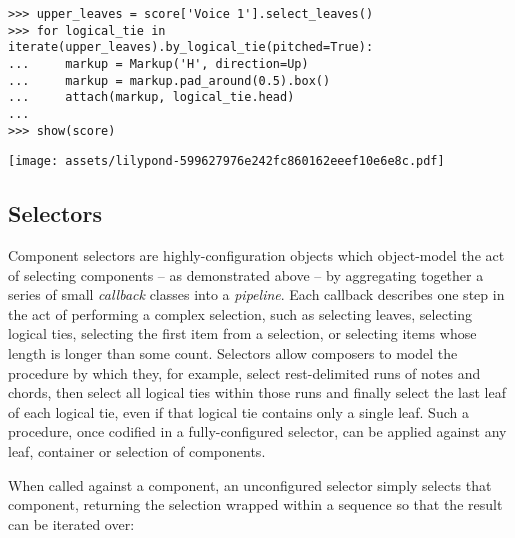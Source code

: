 \begin{comment}
<abjad>
upper_leaves = score['Voice 1'].select_leaves()
for logical_tie in iterate(upper_leaves).by_logical_tie(pitched=True):
    markup = Markup('H', direction=Up)
    markup = markup.pad_around(0.5).box()
    attach(markup, logical_tie.head)

show(score)
</abjad>
\end{comment}

\begin{abjadbookoutput}
\begin{singlespacing}
\vspace{-0.5\baselineskip}
\begin{lstlisting}
>>> upper_leaves = score['Voice 1'].select_leaves()
>>> for logical_tie in iterate(upper_leaves).by_logical_tie(pitched=True):
...     markup = Markup('H', direction=Up)
...     markup = markup.pad_around(0.5).box()
...     attach(markup, logical_tie.head)
...
>>> show(score)
\end{lstlisting}
\noindent\texttt{[image: assets/lilypond-599627976e242fc860162eeef10e6e8c.pdf]}
\end{singlespacing}
\end{abjadbookoutput}

\subsection{Selectors}
\label{ssec:selectors}

Component selectors are highly-configuration objects which object-model the act
of selecting components -- as demonstrated above -- by aggregating together a
series of small \emph{callback} classes into a \emph{pipeline}. Each callback
describes one step in the act of performing a complex selection, such as
selecting leaves, selecting logical ties, selecting the first item from a
selection, or selecting items whose length is longer than some count. Selectors
allow composers to model the procedure by which they, for example, select
rest-delimited runs of notes and chords, then select all logical ties within
those runs and finally select the last leaf of each logical tie, even if that
logical tie contains only a single leaf. Such a procedure, once codified in a
fully-configured selector, can be applied against any leaf, container or
selection of components.

When called against a component, an unconfigured selector simply selects that
component, returning the selection wrapped within a sequence so that the result
can be iterated over:

